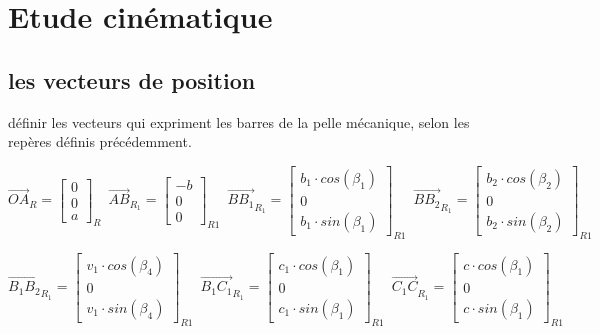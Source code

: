 \documentclass[12pt,a4paper]{article}
\begin{document}
\section{Etude cinématique}


\subsection{les vecteurs de position}

définir les vecteurs qui expriment les barres de la pelle mécanique, selon les repères définis précédemment. 

\begin{equation}
\vec{OA}_R=
\begin{bmatrix}
0 \\
0\\
a
\end{bmatrix}_{R} \enspace
\vec{AB}_{R_{1}}=
\begin{bmatrix}
-b \\
0\\
0
\end{bmatrix}_{R1} \enspace
\vec{B B_1}_{R_{1}}=
\begin{bmatrix}
b_1\cdot cos(\beta_1) \\
0\\
b_1\cdot sin(\beta_1)
\end{bmatrix}_{R1} \enspace
\vec{B B_2}_{R_{1}}=
\begin{bmatrix}
b_2\cdot cos(\beta_2) \\
0\\
b_2\cdot sin(\beta_2)
\end{bmatrix}_{R1} \enspace
\end{equation}

\begin{equation}
\vec{B_1 B_2}_{R_{1}}=
\begin{bmatrix}
v_1\cdot cos(\beta_4) \\
0\\
v_1\cdot sin(\beta_4)
\end{bmatrix}_{R1} \enspace
\vec{B_1 C_1}_{R_{1}}=
\begin{bmatrix}
c_1\cdot cos(\beta_1) \\
0\\
c_1\cdot sin(\beta_1)
\end{bmatrix}_{R1} \enspace
\vec{C_1 C}_{R_{1}}=
\begin{bmatrix}
c\cdot cos(\beta_1) \\
0\\
c\cdot sin(\beta_1)
\end{bmatrix}_{R1} \enspace
\end{equation}
\end{document}
